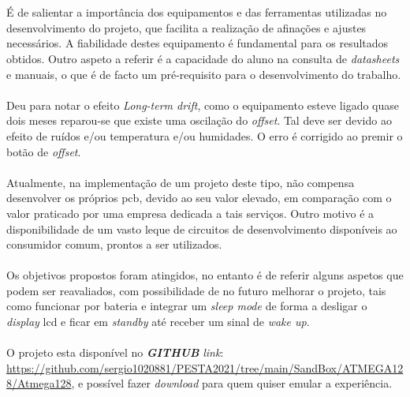 \\
\\
É de salientar a importância dos equipamentos e das ferramentas utilizadas no desenvolvimento do projeto, que facilita a realização de afinações e ajustes necessários. A fiabilidade destes equipamento é fundamental para os resultados obtidos.
Outro aspeto a referir é a capacidade do aluno na consulta de \textit{datasheets} e manuais, o que é de facto um pré-requisito para o desenvolvimento do trabalho.
\\
\\
Deu para notar o efeito \textit{Long-term drift}, como o equipamento esteve ligado quase dois meses reparou-se que existe uma oscilação do \textit{offset}. Tal deve ser devido ao efeito de ruídos e/ou temperatura e/ou humidades. O erro é corrigido ao premir o botão de \textit{offset}.
\\
\\
Atualmente, na implementação de um projeto deste tipo, não compensa desenvolver os próprios \acs{pcb}, devido ao seu valor elevado, em comparação com o valor praticado por uma empresa dedicada a tais serviços. Outro motivo é a disponibilidade  de um vasto leque de circuitos de desenvolvimento disponíveis ao consumidor comum, prontos a ser utilizados.
\\
\\
Os objetivos propostos foram atingidos, no entanto é de referir alguns aspetos que podem ser reavaliados, com possibilidade de no futuro melhorar o projeto, tais como funcionar por bateria e integrar um \textit{sleep mode} de forma a desligar o \textit{display} \acs{lcd} e ficar em \textit{standby} até receber um sinal de \textit{wake up}.
\\
\\
O projeto esta disponível no \textit{\textbf{GITHUB}} \textit{link}: \url{https://github.com/sergio1020881/PESTA2021/tree/main/SandBox/ATMEGA128/Atmega128}, e possível fazer \textit{download} para quem quiser emular a experiência.
